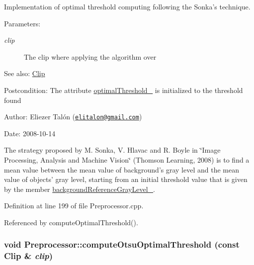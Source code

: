 Implementation of optimal threshold computing following the Sonka's technique. 

\begin{Desc}
\item[Parameters:]
\begin{description}
\item[{\em clip}]The clip where applying the algorithm over\end{description}
\end{Desc}
\begin{Desc}
\item[See also:]\hyperlink{class_clip}{Clip}\end{Desc}
\begin{Desc}
\item[Postcondition:]The attribute \hyperlink{class_preprocessor_865b1e28dd9535b96f70727a550104fe}{optimalThreshold\_\-} is initialized to the threshold found\end{Desc}
\begin{Desc}
\item[Author:]Eliezer Talón (\href{mailto:elitalon@gmail.com}{\tt elitalon@gmail.com}) \end{Desc}
\begin{Desc}
\item[Date:]2008-10-14\end{Desc}
The strategy proposed by M. Sonka, V. Hlavac and R. Boyle in \char`\"{}Image Processing, Analysis and Machine Vision\char`\"{} (Thomson Learning, 2008) is to find a mean value between the mean value of background's gray level and the mean value of objects' gray level, starting from an initial threshold value that is given by the member \hyperlink{class_preprocessor_2c9e44ff6522b2ce35d6bc6161ad2680}{backgroundReferenceGrayLevel\_\-}. 

Definition at line 199 of file Preprocessor.cpp.

Referenced by computeOptimalThreshold().\hypertarget{class_preprocessor_faa4368f471a3e5d0cb46865a2a1ccb7}{
\subsubsection[computeOtsuOptimalThreshold]{\setlength{\rightskip}{0pt plus 5cm}void Preprocessor::computeOtsuOptimalThreshold (const {\bf Clip} \& {\em clip})}}
\label{class_preprocessor_faa4368f471a3e5d0cb46865a2a1ccb7}


